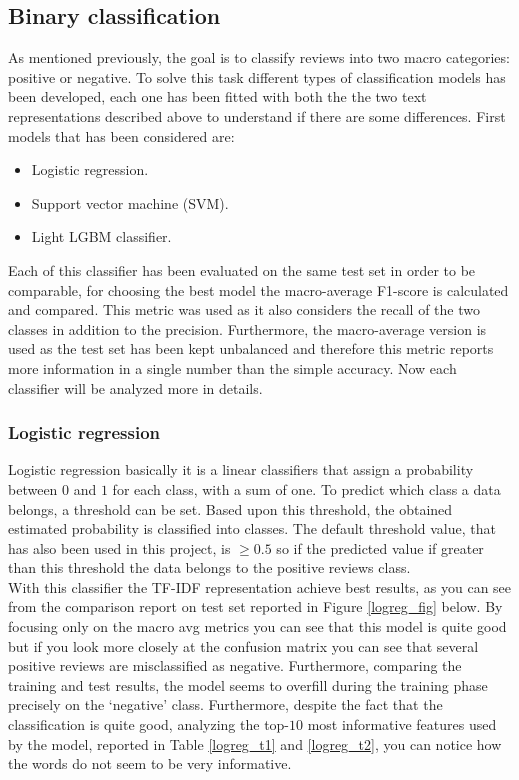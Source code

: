 \documentclass[11pt]{article}
\begin{document}
\subsection{Binary classification}
As mentioned previously, the goal is to classify reviews into two macro categories: positive or negative. To solve this task different types of classification models has been developed, each one has been fitted with both the the two text representations described above to understand if there are some differences. First models that has been considered are:
\begin{itemize}
    \item Logistic regression.
    \item Support vector machine (SVM).
    \item Light LGBM classifier.
\end{itemize}
Each of this classifier has been evaluated on the same test set in order to be comparable, for choosing the best model the macro-average F1-score is calculated and compared. This metric was used as it also considers the recall of the two classes in addition to the precision. Furthermore, the macro-average version is used as the test set has been kept unbalanced and therefore this metric reports more information in a single number than the simple accuracy. Now each classifier will be analyzed more in details.

\subsubsection{Logistic regression}
Logistic regression basically it is a linear classifiers that assign a probability between $0$ and $1$ for each class, with a sum of one. To predict which class a data belongs, a threshold can be set. Based upon this threshold, the obtained estimated probability is classified into classes. The default threshold value, that has also been used in this project, is $\geq 0.5$ so if the predicted value if greater than this threshold the data belongs to the positive reviews class.\\
With this classifier the TF-IDF representation achieve best results, as you can see from the comparison report on test set reported in Figure \ref{logreg_fig} below. By focusing only on the macro avg metrics you can see that this model is quite good but if you look more closely at the confusion matrix you can see that several positive reviews are misclassified as negative. Furthermore, comparing the training and test results, the model seems to overfill during the training phase precisely on the `negative' class. Furthermore, despite the fact that the classification is quite good, analyzing the top-$10$ most informative features used by the model, reported in Table \ref{logreg_t1} and \ref{logreg_t2},  you can notice how the words do not seem to be very informative.
\vspace{1cm}
\end{document}
